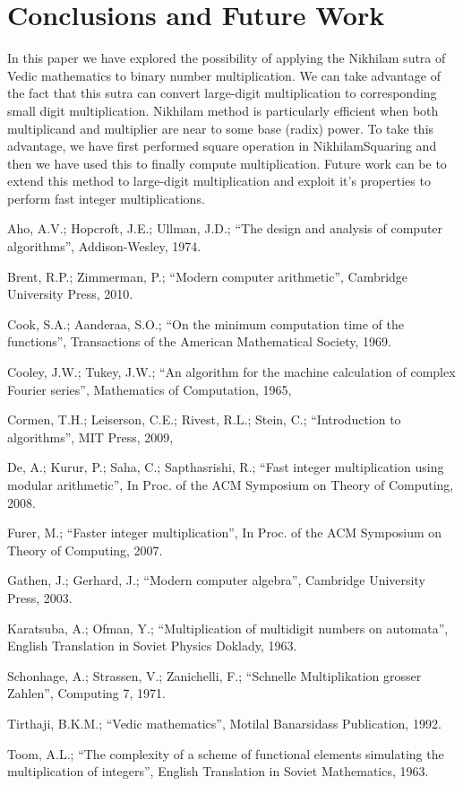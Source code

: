 \documentclass[conference]{IEEEtran}
\begin{document}
\section{Conclusions and Future Work}
In this paper we have explored the possibility of applying the Nikhilam sutra of Vedic mathematics to binary number multiplication. We can take advantage of the fact that this sutra can convert large-digit multiplication to corresponding small digit multiplication. Nikhilam method is particularly efficient when both multiplicand and multiplier are near to some base (radix) power. To take this advantage, we have first performed square operation in NikhilamSquaring and then we have used this to finally compute multiplication.
\indent Future work can be to extend this method to large-digit multiplication and exploit it's properties to perform fast integer multiplications. 

\begin{thebibliography}{23}


\bibitem{}
Aho, A.V.; Hopcroft, J.E.; Ullman, J.D.; ``The design and analysis of computer algorithms'', Addison-Wesley, 1974.

\bibitem{}
Brent, R.P.; Zimmerman, P.; ``Modern computer arithmetic'', Cambridge University Press, 2010.

\bibitem{}
Cook, S.A.; Aanderaa, S.O.; ``On the minimum computation time of the functions'', Transactions of the American Mathematical Society, 1969.

\bibitem{}
Cooley, J.W.; Tukey, J.W.; ``An algorithm for the machine calculation of complex Fourier series'', Mathematics of Computation, 1965,

\bibitem{}
Cormen, T.H.; Leiserson, C.E.; Rivest, R.L.; Stein, C.; ``Introduction to algorithms'', MIT Press, 2009,

\bibitem{}
De, A.; Kurur, P.; Saha, C.; Sapthasrishi, R.; ``Fast integer multiplication using modular arithmetic'', In Proc. of the  ACM Symposium on Theory of Computing, 2008.

\bibitem{}
Furer, M.; ``Faster integer multiplication'', In Proc. of the ACM Symposium on Theory of Computing, 2007.

\bibitem{}
Gathen, J.; Gerhard, J.; ``Modern computer algebra'', Cambridge University Press, 2003.

\bibitem{}
Karatsuba, A.; Ofman, Y.; ``Multiplication of multidigit numbers on automata'', English Translation in Soviet Physics Doklady, 1963.

\bibitem{}
Schonhage, A.; Strassen, V.; Zanichelli, F.; ``Schnelle Multiplikation grosser Zahlen'', Computing 7, 1971.

\bibitem{}
Tirthaji, B.K.M.; ``Vedic mathematics'', Motilal Banarsidass Publication, 1992.

\bibitem{}
Toom, A.L.; ``The complexity of a scheme of functional elements simulating the multiplication of integers'', English Translation in Soviet Mathematics, 1963.



\end{thebibliography}
\end{document}
